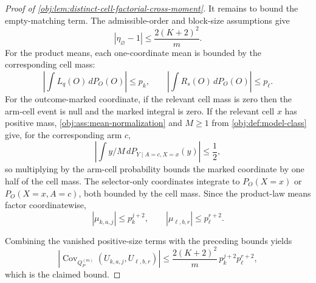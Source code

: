 \begin{proof}[Proof of \cref{obj:lem:distinct-cell-factorial-cross-moment}]
It remains to bound the empty-matching term.  The admissible-order and block-size assumptions give
\[
|\eta_{\varnothing}-1|
\le
\frac{2(K+2)^2}{m}.
\]
For the product means, each one-coordinate mean is bounded by the corresponding cell mass:
\[
\left|\int L_q(O)\,dP_O(O)\right|\le p_k,
\qquad
\left|\int R_s(O)\,dP_O(O)\right|\le p_{\ell}.
\]
For the outcome-marked coordinate, if the relevant cell mass is zero then the arm-cell event is null and the marked integral is zero.  If the relevant cell \(x\) has positive mass, \cref{obj:ass:mean-normalization} and \(M\ge1\) from \cref{obj:def:model-class} give, for the corresponding arm \(c\),
\[
\left|\int y/M\,dP_{Y\mid A=c,X=x}(y)\right|\le \frac12,
\]
so multiplying by the arm-cell probability bounds the marked coordinate by one half of the cell mass.  The selector-only coordinates integrate to \(P_O(X=x)\) or \(P_O(X=x,A=c)\), both bounded by the cell mass.  Since the product-law means factor coordinatewise,
\[
|\mu_{k,a,j}|
\le p_k^{j+2},
\qquad
|\mu_{\ell,b,r}|
\le p_{\ell}^{r+2}.
\]

Combining the vanished positive-size terms with the preceding bounds yields
\[
\left|\operatorname{Cov}_{Q_P^{(m)}}(U_{k,a,j},U_{\ell,b,r})\right|
\le
\frac{2(K+2)^2}{m}\,
p_k^{j+2}p_{\ell}^{r+2},
\]
which is the claimed bound. %
\end{proof}
